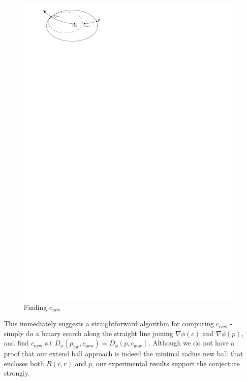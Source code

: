 \documentclass[11pt]{myclass}
\newcommand{\breg}{\ensuremath{D_\phi}}
\begin{document}
\begin{figure}[H]
  \begin{center}
    \includegraphics[scale=1.2]{../figures/interpolate}
  \end{center}
  \caption{Finding $c_{\text{new}}$}
  \label{Trivial fails}
\end{figure}

This immediately suggests a straightforward algorithm for computing $c_{\text{new}}$ - simply do a binary search along the straight line joining $\nabla \phi(c)$ and $\nabla \phi(p)$, and find $c_{\text{new}}$ s.t $\breg(p_{\text{far}}, c_{\text{new}}) = \breg(p, c_{\text{new}})$. Although we do not have a proof that our extend ball approach is indeed the minimal radius new ball that encloses both $B(c,r)$ and $p$, our experimental results support the conjecture strongly.
 
\end{document}
